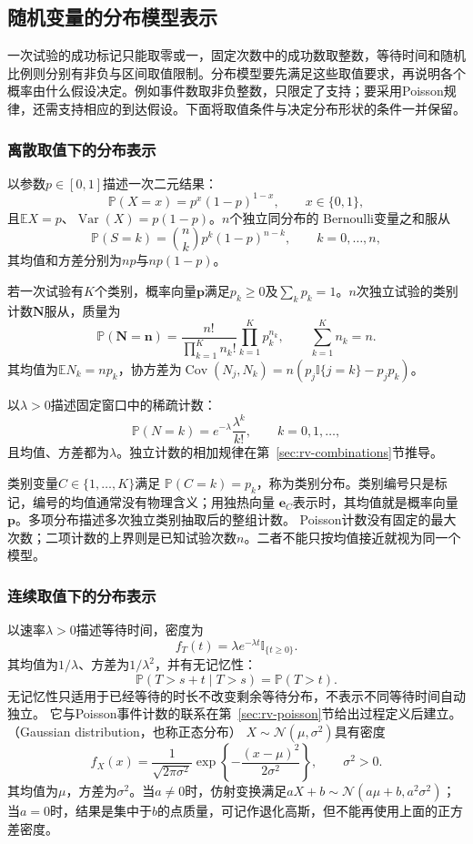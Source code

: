 \subsection{随机变量的分布模型表示}
\label{sec:probability-common-distributions}
\label{sec:probability-families-transformations}
一次试验的成功标记只能取零或一，固定次数中的成功数取整数，等待时间和随机比例则分别有非负与区间取值限制。分布模型要先满足这些取值要求，再说明各个概率由什么假设决定。例如事件数取非负整数，只限定了支持；要采用Poisson规律，还需支持相应的到达假设。下面将取值条件与决定分布形状的条件一并保留。

\subsubsection{离散取值下的分布表示}
以参数\(p\in[0,1]\)描述一次二元结果：
\[ \mathbb{P}(X=x)=p^x(1-p)^{1-x},
  \qquad x\in\{0,1\}, \]
且\(\mathbb{E}X=p\)、\(\operatorname{Var}(X)=p(1-p)\)。\(n\)个独立同分布的
Bernoulli变量之和服从
\[ \mathbb{P}(S=k)
  =\binom{n}{k}p^k(1-p)^{n-k},\qquad k=0,\ldots,n, \]
其均值和方差分别为\(np\)与\(np(1-p)\)。

若一次试验有\(K\)个类别，概率向量\(\bm{p}\)满足\(p_k\geq0\)及\(\sum_kp_k=1\)。\(n\)次独立试验的类别计数\(\bm{N}\)服从，质量为
\[ \mathbb{P}(\bm{N}=\bm{n})
  =\frac{n!}{\prod_{k=1}^{K}n_k!}\prod_{k=1}^{K}p_k^{n_k},\qquad\sum_{k=1}^{K}n_k=n. \]
其均值为\(\mathbb{E}N_k=np_k\)，协方差为\(\operatorname{Cov}(N_j,N_k)=n(p_j\mathbb{I}\{j=k\}-p_jp_k)\)。

以\(\lambda>0\)描述固定窗口中的稀疏计数：
\[ \mathbb{P}(N=k)
  =e^{-\lambda}\frac{\lambda^k}{k!},\qquad k=0,1,\ldots, \]
且均值、方差都为\(\lambda\)。独立计数的相加规律在第~\ref{sec:rv-combinations}节推导。

类别变量\(C\in\{1,\ldots,K\}\)满足
\(\mathbb P(C=k)=p_k\)，称为类别分布。类别编号只是标记，编号的均值通常没有物理含义；用独热向量
\(\bm e_C\)表示时，其均值就是概率向量\(\bm p\)。多项分布描述多次独立类别抽取后的整组计数。
Poisson计数没有固定的最大次数；二项计数的上界则是已知试验次数\(n\)。二者不能只按均值接近就视为同一个模型。

\subsubsection{连续取值下的分布表示}
以速率\(\lambda>0\)描述等待时间，密度为
\[
f_T(t)=\lambda e^{-\lambda t}\mathbb I_{\{t\geq0\}}.
\]
其均值为\(1/\lambda\)、方差为\(1/\lambda^2\)，并有无记忆性：
\[ \mathbb{P}(T>s+t\mid T>s)=\mathbb{P}(T>t). \]
无记忆性只适用于已经等待的时长不改变剩余等待分布，不表示不同等待时间自动独立。
它与Poisson事件计数的联系在第~\ref{sec:rv-poisson}节给出过程定义后建立。
（Gaussian distribution，也称正态分布）
\(X\sim\mathcal{N}(\mu,\sigma^2)\)具有密度
\[ f_X(x)
  =\frac{1}{\sqrt{2\pi\sigma^2}}\exp\left\{-\frac{(x-\mu)^2}{2\sigma^2}\right\},\qquad \sigma^2>0. \]
其均值为\(\mu\)，方差为\(\sigma^2\)。当\(a\neq0\)时，仿射变换满足\(aX+b\sim\mathcal{N}(a\mu+b,a^2\sigma^2)\)；当\(a=0\)时，结果是集中于\(b\)的点质量，可记作退化高斯，但不能再使用上面的正方差密度。

